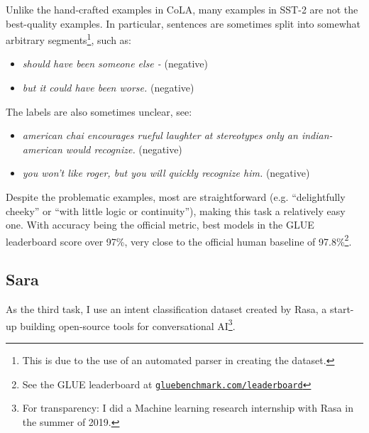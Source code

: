 \documentclass[bsc,frontabs,twoside,singlespacing,parskip,deptreport]{infthesis}
\newcommand\rurl[1]{%
  \href{https://#1}{\nolinkurl{#1}}%
}
\begin{document}
{{{      Unlike the hand-crafted examples in CoLA, many examples in SST-2 are not the best-quality examples. In particular, sentences are sometimes split into somewhat arbitrary segments\footnote{This is due to the use of an automated parser in creating the dataset.}, such as:
      \begin{itemize}
        \item \textit{should have been someone else - } (negative)
        \item \textit{but it could have been worse.} (negative)
      \end{itemize}
      
      The labels are also sometimes unclear, see:
      \begin{itemize}
        \item \textit{american chai encourages rueful laughter at stereotypes only an indian-american would recognize.} (negative)
        \item \textit{you won't like roger, but you will quickly recognize him.} (negative)
      \end{itemize}

      Despite the problematic examples, most are straightforward (e.g. ``delightfully cheeky'' or ``with little logic or continuity''), making this task a relatively easy one. With accuracy being the official metric, best models in the GLUE leaderboard score over 97\%, very close to the official human baseline of 97.8\%\footnote{See the GLUE leaderboard at \rurl{gluebenchmark.com/leaderboard}}.
    }

    \subsection{Sara}{
      \label{sec:datasets-Sara}

      As the third task, I use an intent classification dataset created by Rasa, a start-up building open-source tools for conversational AI\footnote{For transparency: I did a Machine learning research internship with Rasa in the summer of 2019.}.

}}}
\end{document}
